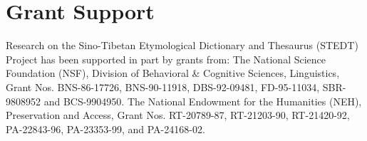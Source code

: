 \documentclass[12pt]{article}
\begin{document}
\doublespacing
\section{Grant Support}
Research on the Sino-Tibetan Etymological Dictionary and 
Thesaurus (STEDT) Project has been supported in part by grants 
from: The National Science Foundation (NSF), Division of Behavioral \& Cognitive Sciences, Linguistics, Grant Nos. BNS-86-17726, BNS-90-11918, DBS-92-09481, FD-95-11034, SBR-9808952 and BCS-9904950.
The National Endowment for the Humanities (NEH), Preservation and Access, Grant Nos. RT-20789-87, RT-21203-90, RT-21420-92, PA-22843-96, PA-23353-99, and PA-24168-02.
\end{document}
